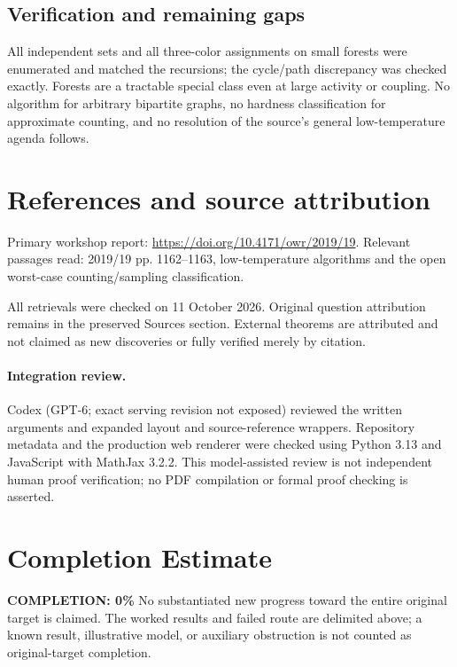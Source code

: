 \documentclass[11pt]{article}
\begin{document}
\subsection{Verification and remaining gaps}
All independent sets and all three-color assignments on small forests were enumerated and matched the recursions; the cycle/path discrepancy was checked exactly. Forests are a tractable special class even at large activity or coupling. No algorithm for arbitrary bipartite graphs, no hardness classification for approximate counting, and no resolution of the source's general low-temperature agenda follows.

\section{References and source attribution}
Primary workshop report: \url{https://doi.org/10.4171/owr/2019/19}. Relevant passages read: 2019/19 pp. 1162--1163, low-temperature algorithms and the open worst-case counting/sampling classification.

All retrievals were checked on 11 October 2026. Original question attribution remains in the preserved Sources section. External theorems are attributed and not claimed as new discoveries or fully verified merely by citation.


\paragraph{Integration review.} Codex (GPT-6; exact serving revision not exposed) reviewed the written arguments and expanded layout and source-reference wrappers. Repository metadata and the production web renderer were checked using Python 3.13 and JavaScript with MathJax 3.2.2. This model-assisted review is not independent human proof verification; no PDF compilation or formal proof checking is asserted.

\section{Completion Estimate}
\noindent\textbf{COMPLETION: 0\%}
No substantiated new progress toward the entire original target is claimed. The worked results and failed route are delimited above; a known result, illustrative model, or auxiliary obstruction is not counted as original-target completion.
\end{document}

